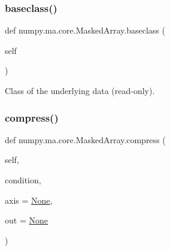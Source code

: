 \subsubsection{\texorpdfstring{baseclass()}{baseclass()}}
{\footnotesize\ttfamily def numpy.\+ma.\+core.\+Masked\+Array.\+baseclass (\begin{DoxyParamCaption}\item[{}]{self }\end{DoxyParamCaption})}

\begin{DoxyVerb}Class of the underlying data (read-only). \end{DoxyVerb}
 \mbox{\label{classnumpy_1_1ma_1_1core_1_1MaskedArray_aad6091c0fb1586c8d7510a37e50d3e72}} 
\subsubsection{\texorpdfstring{compress()}{compress()}}
{\footnotesize\ttfamily def numpy.\+ma.\+core.\+Masked\+Array.\+compress (\begin{DoxyParamCaption}\item[{}]{self,  }\item[{}]{condition,  }\item[{}]{axis = {\ttfamily \hyperlink{namespacenumpy_1_1ma_1_1core_a647ee1848dfa3692fe35a663a2aa40b3}{None}},  }\item[{}]{out = {\ttfamily \hyperlink{namespacenumpy_1_1ma_1_1core_a647ee1848dfa3692fe35a663a2aa40b3}{None}} }\end{DoxyParamCaption})}

